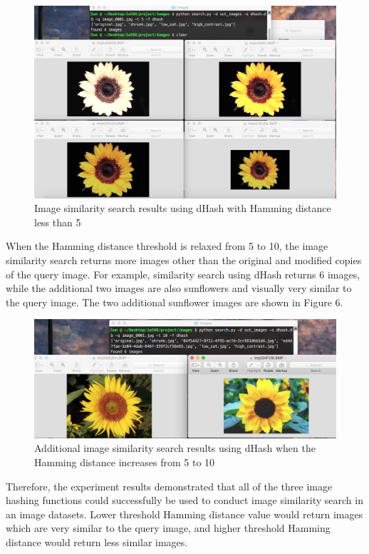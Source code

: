 \documentclass[letterpaper,12pt]{article}
\begin{document}
\begin{figure}[h!]
	\centering
	\includegraphics[scale=0.3]{figures/figure_5}
	\caption{Image similarity search results using dHash with Hamming distance less than 5}
\end{figure}

When the Hamming distance threshold is relaxed from 5 to 10, the image similarity search returns more images other than the original and modified copies of the query image. For example, similarity search using dHash returns 6 images, while the additional two images are also sunflowers and visually very similar to the query image. The two additional sunflower images are shown in Figure 6.

\begin{figure}[h!]
	\centering
	\includegraphics[scale=0.3]{figures/figure_6}
	\caption{Additional image similarity search results using dHash when the Hamming distance increases from 5 to 10}
\end{figure}

Therefore, the experiment results demonstrated that all of the three image hashing functions could successfully be used to conduct image similarity search in an image datasets. Lower threshold Hamming distance value would return images which are very similar to the query image, and higher threshold Hamming distance would return less similar images.
\end{document}
